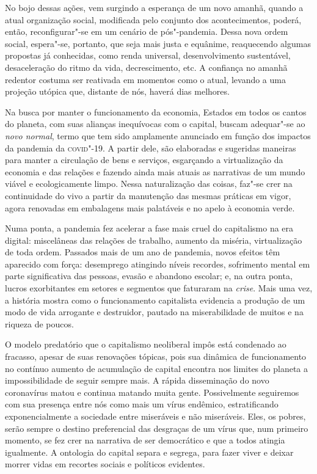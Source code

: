 No bojo dessas ações, vem surgindo a esperança de um novo amanhã, quando
a atual organização social, modificada pelo conjunto dos acontecimentos,
poderá, então, reconfigurar"-se em um cenário de pós"-pandemia. Dessa nova
ordem social, espera"-se, portanto, que seja mais justa e equânime,
reaquecendo algumas propostas já conhecidas, como renda universal,
desenvolvimento sustentável, desaceleração do ritmo da vida,
decrescimento, etc. A confiança no amanhã redentor costuma ser reativada
em momentos como o atual, levando a uma projeção utópica que, distante
de nós, haverá dias melhores.

Na busca por manter o funcionamento da economia, Estados em todos os
cantos do planeta, com suas alianças inequívocas com o capital, buscam
adequar"-se ao \emph{novo normal}, termo que tem sido amplamente
anunciado em função dos impactos da pandemia da \textsc{covid}"-19. A partir dele,
são elaboradas e sugeridas maneiras para manter a circulação de bens e
serviços, esgarçando a virtualização da economia e das relações e
fazendo ainda mais atuais as narrativas de um mundo viável e
ecologicamente limpo. Nessa naturalização das coisas, faz"-se crer na
continuidade do vivo a partir da manutenção das mesmas práticas em
vigor, agora renovadas em embalagens mais palatáveis e no apelo à
economia verde.

Numa ponta, a pandemia fez acelerar a fase mais cruel do capitalismo na
era digital: miscelâneas das relações de trabalho, aumento da miséria,
virtualização de toda ordem. Passados mais de um ano de pandemia,
novos efeitos têm aparecido com força: desemprego atingindo níveis
recordes, sofrimento mental em parte significativa das pessoas, evasão e
abandono escolar; e, na outra ponta, lucros exorbitantes em setores e
segmentos que faturaram na \emph{crise}. Mais uma vez, a história mostra
como o funcionamento capitalista evidencia a produção de um modo de vida
arrogante e destruidor, pautado na miserabilidade de muitos e na riqueza
de poucos.

O modelo predatório que o capitalismo neoliberal impôs está condenado ao
fracasso, apesar de suas renovações tópicas, pois sua dinâmica de
funcionamento no contínuo aumento de acumulação de capital encontra nos
limites do planeta a impossibilidade de seguir sempre mais. A rápida
disseminação do novo coronavírus matou e continua matando muita gente.
Possivelmente seguiremos com sua presença entre nós como mais um vírus
endêmico, estratificando exponencialmente a sociedade entre miseráveis e
não miseráveis. Eles, os pobres, serão sempre o destino preferencial das
desgraças de um vírus que, num primeiro momento, se fez crer na
narrativa de ser democrático e que a todos atingia igualmente. A
ontologia do capital separa e segrega, para fazer viver e deixar morrer
vidas em recortes sociais e políticos evidentes.

